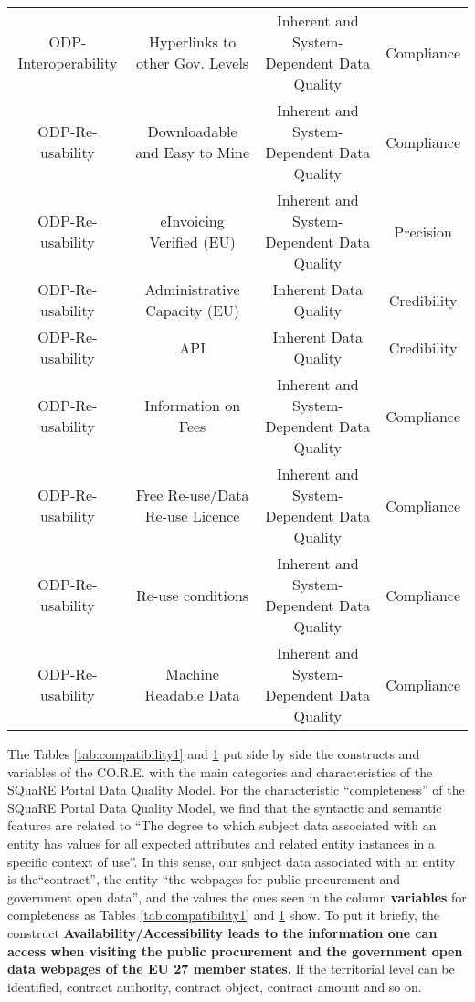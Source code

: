 \documentclass[a4paper, twoside]{report}
\begin{document}
\begin{table}[htbp]
\begin{adjustbox}{max width=\linewidth}
\begin{tabular}{cc|cc}
    \rowcolor[rgb]{ .851,  .851,  .851} ODP-Interoperability & Hyperlinks to other Gov. Levels & Inherent and System-Dependent Data Quality & Compliance \\
    ODP-Re-usability & Downloadable and Easy to Mine & Inherent and System-Dependent Data Quality & Compliance \\
    \rowcolor[rgb]{ .851,  .851,  .851} ODP-Re-usability & eInvoicing Verified (EU) & Inherent and System-Dependent Data Quality & Precision \\
    ODP-Re-usability & Administrative Capacity (EU) & Inherent Data Quality & Credibility \\
    ODP-Re-usability & API   & Inherent Data Quality & Credibility \\
    \rowcolor[rgb]{ .851,  .851,  .851} ODP-Re-usability & Information on Fees & Inherent and System-Dependent Data Quality & Compliance \\
    \rowcolor[rgb]{ .851,  .851,  .851} ODP-Re-usability & Free Re-use/Data Re-use Licence & Inherent and System-Dependent Data Quality & Compliance \\
    \rowcolor[rgb]{ .851,  .851,  .851} ODP-Re-usability & Re-use conditions & Inherent and System-Dependent Data Quality & Compliance \\
    \rowcolor[rgb]{ .851,  .851,  .851} ODP-Re-usability & Machine Readable Data & Inherent and System-Dependent Data Quality & Compliance \\
    \bottomrule
    \end{tabular}%
    \end{adjustbox}
  \label{tab:compatibility2}%
\end{table}%


The Tables \ref{tab:compatibility1} and \ref{tab:compatibility2} put side by side the constructs and variables of the CO.R.E. with the main categories and characteristics of the SQuaRE Portal Data Quality Model. For the characteristic ``completeness'' of the SQuaRE Portal Data Quality Model, we find that the syntactic and semantic features are related to ``The degree to which subject data associated with an entity has values for all expected attributes and related entity instances in a specific context of use''. In this sense, our subject data associated with an entity is the``contract'', the entity ``the webpages for public procurement and government open data'', and the values the ones seen in the column \textbf{variables} for completeness as Tables \ref{tab:compatibility1} and \ref{tab:compatibility2} show. To put it briefly, the construct \textbf{Availability/Accessibility leads to the information one can access when visiting the public procurement and the government open data webpages of the EU 27 member states.} If the territorial level can be identified, contract authority, contract object, contract amount and so on.
  
\end{document}
